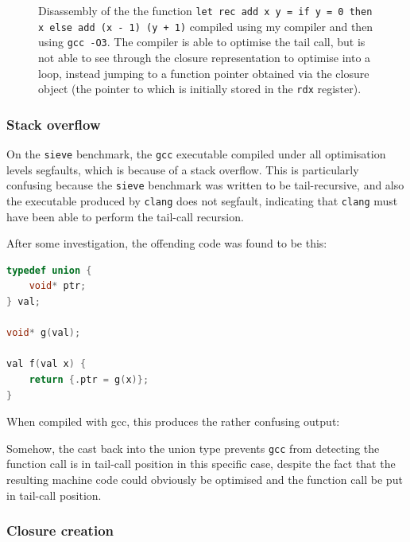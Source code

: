\documentclass[12pt,a4paper,twoside,openright]{report}
\begin{document}
\begin{figure}
    \centering
    
    \caption{Disassembly of the the function \texttt{let rec add x y = if y = 0 
    then x else add (x - 1) (y + 1)} compiled using my compiler and then using 
    \texttt{gcc -O3}. The compiler is able to optimise the tail call, but is 
    not able to see through the closure representation to optimise into a loop, 
    instead jumping to a function pointer obtained via the closure object (the 
    pointer to which is initially stored in the \texttt{rdx} register).}
    \label{fig:tail-recursion}
\end{figure}

\subsubsection{Stack overflow} \label{stack-overflow}

On the \texttt{sieve} benchmark, the \texttt{gcc} executable compiled under all 
optimisation levels segfaults, which is because of a stack overflow. This is 
particularly confusing because the \texttt{sieve} benchmark was written to be 
tail-recursive, and also the executable produced by \texttt{clang} does not 
segfault, indicating that \texttt{clang} must have been able to perform the 
tail-call recursion.

After some investigation, the offending code was found to be this:

\begin{lstlisting}[language=C]
typedef union {
    void* ptr;
} val;

void* g(val);

val f(val x) {
    return {.ptr = g(x)};
}
\end{lstlisting}

When compiled with gcc, this produces the rather confusing output:



Somehow, the cast back into the union type prevents \texttt{gcc} from detecting 
the function call is in tail-call position in this specific case, despite the 
fact that the resulting machine code could obviously be optimised and the 
function call be put in tail-call position.

\subsubsection{Closure creation}
\end{document}
